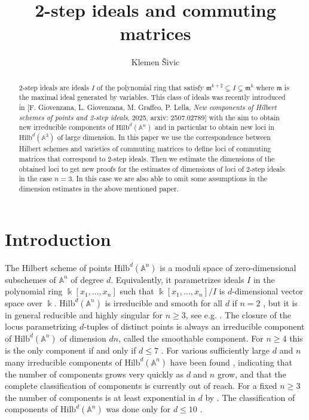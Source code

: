 \documentclass[11pt]{amsart}
\theoremstyle{definition}
\newcommand{\A}{\mathbb{A}}
\newcommand{\m}{\mathfrak{m}}
\newcommand{\Hilb}[2]{\mathrm{Hilb}^{#1}(\A^{#2})}
\begin{document}
\title{2-step ideals and commuting matrices}
\author{Klemen Šivic}
\address{University of Ljubljana, Faculty of mathematics and physics, Jadranska 19, 1000 Ljubljana, Slovenia, and Institute of mathematics, physics and mechanics, Jadranska 19, 1000 Ljubljana, Slovenia}
\maketitle

\begin{abstract}
2-step ideals are ideals $I$ of the polynomial ring that satisfy $\m^{k+2}\subsetneq I\subsetneq \m^k$ where $\m$ is the maximal ideal generated by variables. This class of ideals was recently introduced in [F. Giovenzana, L. Giovenzana, M. Graffeo, P. Lella, {\em New components of Hilbert schemes of points and 2-step ideals}, 2025, arxiv: 2507.02789] with the aim to obtain new irreducible components of $\Hilb{d}{n}$ and in particular to obtain new loci in $\Hilb{d}{3}$ of large dimension. In this paper we use the correspondence between Hilbert schemes and varieties of commuting matrices to define loci of commuting matrices that correspond to 2-step ideals. Then we estimate the dimensions of the obtained loci to get new proofs for the estimates of dimensions of loci of 2-step ideals in the case $n=3$. In this case we are also able to omit some assumptions in the dimension estimates in the above mentioned paper.
\end{abstract}


\section{Introduction}

The Hilbert scheme of points $\Hilb{d}{n}$ is a moduli space of zero-dimensional subschemes of $\A^n$ of degree $d$. Equivalently, it parametrizes ideals $I$ in the polynomial ring $\Bbbk[x_1,\ldots ,x_n]$ such that $\Bbbk[x_1,\ldots ,x_n]/I$ is $d$-dimensional vector space over $\Bbbk$. $\Hilb{d}{n}$ is irreducible and smooth for all $d$ if $n=2$ \cite{Fog}, but it is in general reducible and highly singular for $n\ge 3$, see e.g. \cite{Jel - generically nonreduced, Jel - pathologies}. The closure of the locus parametrizing $d$-tuples of distinct points is always an irreducible component of $\Hilb{d}{n}$ of dimension $dn$, called the smoothable component. For $n\ge 4$ this is the only component if and only if $d\le 7$ \cite{IE, Maz}. For various sufficiently large $d$ and $n$ many irreducible components of $\Hilb{d}{n}$ have been found \cite{CFM, GGGL, GGGL - unexpected, Hui1, Hui2, Iar,  IE,  IK, Jel - elementary components, Jel - generically nonreduced, KK, SS, SS2, Sha, Sza}, indicating that the number of components grows very quickly as $d$ and $n$ grow, and that the complete classification of components  is currently out of reach. For a fixed $n\ge 3$ the number of components is at least exponential in $d$ by \cite[Theorem 3]{Iar2}. The classification of components of $\Hilb{d}{n}$ was done only for $d\le 10$ \cite{CEVV, GKS}.
\end{document}
